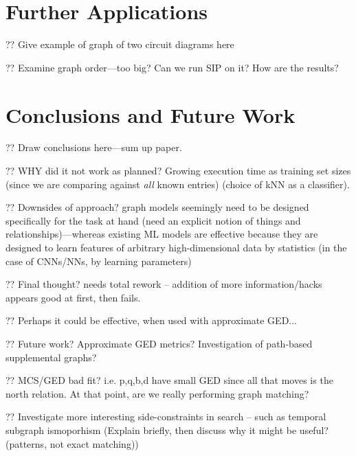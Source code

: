 \documentclass{mpaper}
\begin{document}

\section{Further Applications}
\label{sec:applications}

?? Give example of graph of two circuit diagrams here

?? Examine graph order---too big? Can we run SIP on it? How are the results?

\section{Conclusions and Future Work}
\label{sec:conclusion}

?? Draw conclusions here---sum up paper.

?? WHY did it not work as planned? Growing execution time as training set sizes (since we are comparing against \emph{all} known entries) (choice of kNN as a classifier).

?? Downsides of approach? graph models seemingly need to be designed specifically for the task at hand (need an explicit notion of things and relationships)---whereas existing ML models are effective because they are designed to learn features of arbitrary high-dimensional data by statistics (in the case of CNNs/NNs, by learning parameters)

?? Final thought? needs total rework -- addition of more information/hacks appears good at first, then fails.

?? Perhaps it could be effective, when used with approximate GED... \cite{GED-Approx}

?? Future work? Approximate GED metrics? Investigation of path-based supplemental graphs?

?? MCS/GED bad fit? i.e. p,q,b,d have small GED since all that moves is the north relation. At that point, are we really performing graph matching?

?? Investigate more interesting side-constraints in search -- such as temporal subgraph ismoporhism \cite{TSIP-Long} (Explain briefly, then discuss why it might be useful? (patterns, not exact matching))
\end{document}
